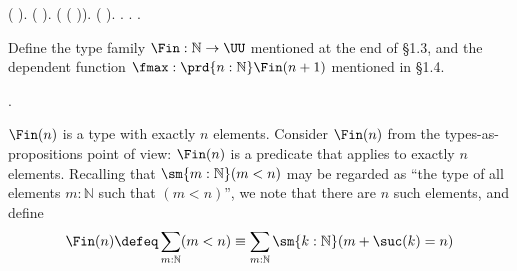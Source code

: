 \begin{coqdoccode}
\coqdocindent{1.00em}
 (\coqdocvar{\_}  \coqdocnotation{(} \coqdocvar{\_} \coqdocvar{\_}\coqdocnotation{)}).\coqdoceol
\coqdocindent{1.00em}
 (\coqdocvar{\_}  \coqdocnotation{(} \coqdocvar{\_} \coqdocvar{\_} \coqdocvar{\_}\coqdocnotation{)\^{}}).\coqdoceol
\coqdocindent{1.00em}
 ( ( )).  (  \coqdocvar{\_}).  .\coqdoceol
\coqdocnoindent
{}.\coqdoceol
\coqdocemptyline
\coqdocnoindent
{}\coqdocindent{0.50em}
  .\coqdoceol
\coqdocemptyline
\end{coqdoccode}
Define the type family $\Fin : \mathbb{N} \to \UU$ mentioned at the end of
\S1.3, and the dependent function $\fmax : \prd{n : \mathbb{N}} \Fin(n + 1)$
mentioned in \S1.4. \begin{coqdoccode}
\coqdocemptyline
\coqdocnoindent
{}\coqdocindent{0.50em}
  .\coqdoceol
\coqdocemptyline
\end{coqdoccode}
\soln  
$\Fin(n)$ is a type with exactly $n$ elements.  Consider $\Fin(n)$ from the
types-as-propositions point of view: $\Fin(n)$ is a predicate that applies to
exactly $n$ elements.  Recalling that $\sm{m:\mathbb{N}}(m < n)$ may be
regarded as ``the type of all elements $m : \mathbb{N}$ such that $(m < n)$'',
we note that there are $n$ such elements, and define
\[
  \Fin(n) 
  \defeq \sum_{m:\mathbb{N}} (m < n)
  \equiv \sum_{m:\mathbb{N}} \sm{k:\mathbb{N}}(m+ \suc(k) = n)
\]
